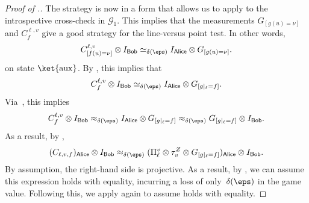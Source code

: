 \documentclass[11pt]{article}
\newcommand{\consistency}{\simeq}
\newcommand{\game}{\mathscr{G}}
\newcommand{\reg}[1]{{\mathsf{#1}}}
\begin{document}
\begin{proof}[Proof of .]
The strategy is now in a form that allows us to apply 
to the introspective cross-check in $\game_1$.
This implies that the measurements $G_{[g(u) = \nu]}$ and $C^{\ell, v}_f$ give a good strategy for the line-versus point test. In other words,
\begin{equation*}
C^{\ell,v}_{[f(u) = \nu]} \otimes I_{\reg{Bob}} \consistency_{\delta(\eps)} I_{\reg{Alice}} \otimes G_{[g(u)=\nu]}.
\end{equation*}
on state $\ket{\mathrm{aux}}$. By , this implies that
\begin{equation*}
C^{\ell,v}_{f} \otimes I_{\reg{Bob}} \consistency_{\delta(\eps)} I_{\reg{Alice}} \otimes G_{[g|_{\ell} = f]}.
\end{equation*}
Via~, this implies
\begin{equation*}
C^{\ell,v}_{f} \otimes I_{\reg{Bob}}
\approx_{\delta(\eps)} I_{\reg{Alice}} \otimes G_{[g|_{\ell} = f]}
\approx_{\delta(\eps)} G_{[g|_{\ell} = f]} \otimes I_{\reg{Bob}}.
\end{equation*}
As a result, by ,
\begin{equation*}
(C_{\ell, v, f})_{\reg{Alice}} \otimes I_{\reg{Bob}} \approx_{\delta(\eps)} (\Pi_{\ell}^v \otimes \tau_v^Z \otimes G_{[g|_{\ell}=f]})_{\reg{Alice}} \otimes I_{\reg{Bob}}.
\end{equation*}
By assumption, the right-hand side is projective.
As a result, by , we can assume this expression holds with equality, incurring a loss of only~$\delta(\eps)$ in the game value.
Following this, we apply  again to assume  holds with equality.


\end{proof}
\end{document}
